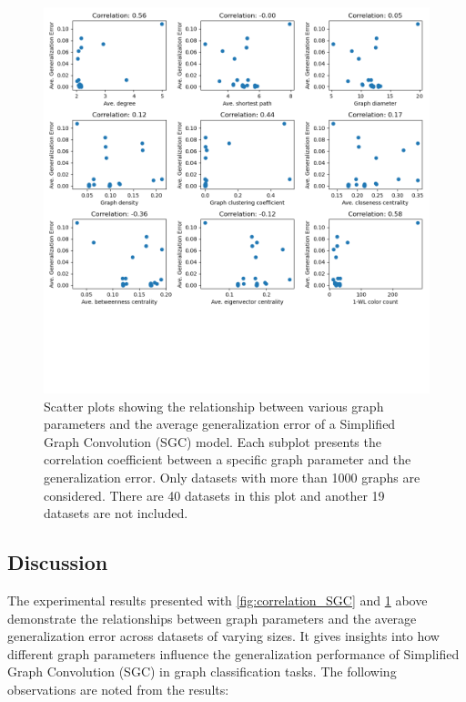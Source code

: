 \begin{figure}[H]
    \centering
    \includegraphics[width=\textwidth]{images/correlation_ignore_less_than_1000_SGC.png}
    \caption{Scatter plots showing the relationship between various graph parameters and the average generalization error of a Simplified Graph Convolution (SGC) model. Each subplot presents the correlation coefficient between a specific graph parameter and the generalization error. Only datasets with more than 1000 graphs are considered. There are 40 datasets in this plot and another 19 datasets are not included.}
    \label{fig:correlation_ignore_less_than_1000_SGC}
\end{figure}

\subsection{Discussion}

The experimental results presented with \ref{fig:correlation_SGC} and \ref{fig:correlation_ignore_less_than_1000_SGC}  above demonstrate the relationships between graph parameters and the average generalization error across datasets of varying sizes. It gives insights into how different graph parameters influence the generalization performance of Simplified Graph Convolution (SGC) in graph classification tasks. The following observations are noted from the results:

